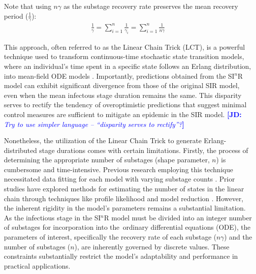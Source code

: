 \documentclass[12pt]{article}
\newcommand{\comment}{}
\renewcommand{\comment}{\nocomment}
\renewcommand{\comment}{\showcomment}
\newcommand{\showcomment}[3]{\textcolor{#1}{\textbf{[#2: }\textsl{#3}\textbf{]}}}
\newcommand{\nocomment}[3]{}
\newcommand{\jd}[1]{\comment{blue}{JD}{#1}}
\begin{document}
Note that using $n\gamma$ as the substage recovery rate preserves the mean recovery period ($\frac{1}{\gamma}$):
\begin{align*}
    \frac{1}{\gamma} = \sum_{i=1}^{n} \frac{1}{\gamma_i} = \sum_{i=1}^{n} \frac{1}{n\gamma}
\end{align*}

This approach, often referred to as the Linear Chain Trick (LCT)\cite{MacDonald1978}, is a powerful technique used to transform continuous-time stochastic state transition models, where an individual's time spent in a specific state follows an Erlang distribution, into mean-field ODE models \cite{Kirosingh2019}. Importantly, predictions obtained from the SI$^n$R model can exhibit significant divergence from those of the original SIR model, even when the mean infectous stage duration remains the same. This disparity serves to rectify the tendency of overoptimistic predictions that suggest minimal control measures are sufficient to mitigate an epidemic in the SIR model\cite{Wearing2005}.
\jd{Try to use simpler language -- “disparity serves to rectify”?}

Nonetheless, the utilization of the Linear Chain Trick to generate Erlang-distributed stage durations comes with certain limitations. Firstly, the process of determining the appropriate number of substages (shape parameter, $n$) is cumbersome and time-intensive. Previous research employing this technique necessitated data fitting for each model with varying substage counts \cite{Wearing2005}\cite{Hurtado2021}. Prior studies have explored methods for estimating the number of states in the linear chain through techniques like profile likelihood \cite{Raue2009} and model reduction \cite{Maiwald2016}. However, the inherent rigidity in the model's parameters remains a substantial limitation. As the infectious stage in the SI$^n$R model must be divided into an integer number of substages for incorporation into the ordinary differential equations (ODE), the parameters of interest, specifically the recovery rate of each substage ($n\gamma$) and the number of substages ($n$), are inherently governed by discrete values. These constraints substantially restrict the model's adaptability and performance in practical applications.
\end{document}
